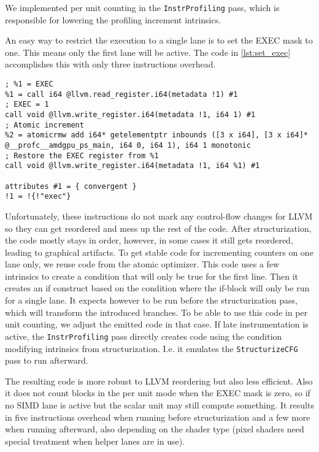 We implemented per unit counting in the \texttt{InstrProfiling} pass, which is responsible for lowering the profiling increment intrinsics.

An easy way to restrict the execution to a single lane is to set the EXEC mask to one. This means only the first lane will be active.
The code in \cref{lst:set_exec} accomplishes this with only three instructions overhead.
\begin{lstlisting}[caption={Restricting execution to a single SIMD unit},label=lst:set_exec,language={[x86masm]Assembler}]
; %1 = EXEC
%1 = call i64 @llvm.read_register.i64(metadata !1) #1
; EXEC = 1
call void @llvm.write_register.i64(metadata !1, i64 1) #1
; Atomic increment
%2 = atomicrmw add i64* getelementptr inbounds ([3 x i64], [3 x i64]* @__profc__amdgpu_ps_main, i64 0, i64 1), i64 1 monotonic
; Restore the EXEC register from %1
call void @llvm.write_register.i64(metadata !1, i64 %1) #1

attributes #1 = { convergent }
!1 = !{!"exec"}
\end{lstlisting}

Unfortunately, these instructions do not mark any control-flow changes for LLVM so they can get reordered and mess up the rest of the code.
After structurization, the code mostly stays in order, however, in some cases it still gets reordered, leading to graphical artifacts.
To get stable code for incrementing counters on one lane only, we reuse code from the atomic optimizer.
This code uses a few intrinsics to create a condition that will only be true for the first line.
Then it creates an if construct based on the condition where the if-block will only be run for a single lane.
It expects however to be run before the structurization pass, which will transform the introduced branches.
To be able to use this code in per unit counting, we adjust the emitted code in that case.
If late instrumentation is active, the \texttt{InstrProfiling} pass directly creates code using the condition modifying intrinsics from structurization.
I.e. it emulates the \texttt{StructurizeCFG} pass to run afterward.

The resulting code is more robust to LLVM reordering but also less efficient.
Also it does not count blocks in the per unit mode when the EXEC mask is zero, so if no SIMD lane is active but the scalar unit may still compute something.
It results in five instructions overhead when running before structurization and a few more when running afterward, also depending on the shader type (pixel shaders need special treatment when helper lanes are in use).
